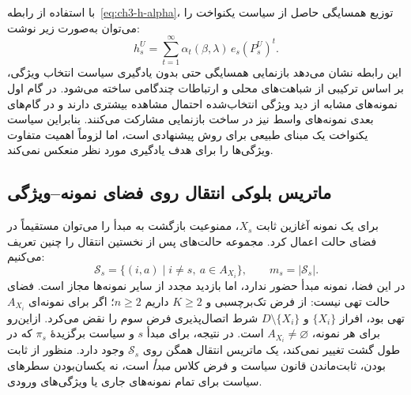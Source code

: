 با استفاده از رابطه~\eqref{eq:ch3-h-alpha}، توزیع همسایگی حاصل از سیاست یکنواخت را می‌توان به‌صورت زیر نوشت:
\begin{equation}\label{eq:ch3-uniform-h}
h_s^{U}=\sum_{t=1}^{\infty}
\alpha_t(\beta,\lambda)\,e_s(P_s^{U})^t.
\end{equation}
این رابطه نشان می‌دهد بازنمایی همسایگی حتی بدون یادگیری سیاست انتخاب ویژگی، بر اساس ترکیبی از شباهت‌های محلی و ارتباطات چندگامی ساخته می‌شود. در گام اول نمونه‌های مشابه از دید ویژگی انتخاب‌شده احتمال مشاهده بیشتری دارند و در گام‌های بعدی نمونه‌های واسط نیز در ساخت بازنمایی مشارکت می‌کنند. بنابراین سیاست یکنواخت یک مبنای طبیعی برای روش پیشنهادی است، اما لزوماً اهمیت متفاوت ویژگی‌ها را برای هدف یادگیری مورد نظر منعکس نمی‌کند.


\subsection{ماتریس بلوکی انتقال روی فضای نمونه--ویژگی}
\label{subsec:ch3-block-matrix-transition}
برای یک نمونه آغازین ثابت $X_s$، ممنوعیت بازگشت به مبدأ را می‌توان مستقیماً در فضای حالت اعمال کرد. مجموعه حالت‌های پس از نخستین انتقال را چنین تعریف می‌کنیم:
\begin{equation}\label{eq:ch3-state-space}
\mathcal S_s=\{(i,a)\mid i\ne s,\ a\in A_{X_i}\},
\qquad m_s=|\mathcal S_s|.
\end{equation}
در این فضا، نمونه مبدأ حضور ندارد، اما بازدید مجدد از سایر نمونه‌ها مجاز است.
فضای حالت تهی نیست: از فرض تک‌برچسبی و $K\ge2$
داریم $n\ge2$؛ اگر برای نمونه‌ای $A_{X_i}$ تهی بود،
افراز $\{X_i\}$ و $D\setminus\{X_i\}$ شرط اتصال‌پذیری
فرض سوم را نقض می‌کرد. ازاین‌رو برای هر نمونه،
$A_{X_i}\ne\varnothing$ است.
در نتیجه، برای مبدأ $s$ و سیاست برگزیدهٔ $\pi_s$ که در طول
گشت تغییر نمی‌کند، یک ماتریس انتقال همگن روی
$\mathcal S_s$ وجود دارد. منظور از ثابت بودن،
ثابت‌ماندن قانون سیاست و فرض کلاس \emph{مبدأ}
است، نه یکسان‌بودن سطرهای سیاست برای تمام
نمونه‌های جاری یا ویژگی‌های ورودی.

